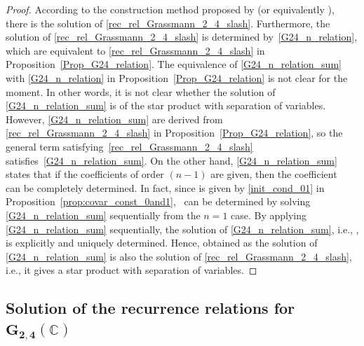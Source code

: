 \documentclass[10pt,a4paper]{amsart}
\numberwithin{equation}{section}
\begin{document}
\begin{proof}
According to the construction method proposed by \cite{HS1,HS2} (or equivalently \cite{SSU1,SSU2}), there is the solution
of \eqref{rec_rel_Grassmann_2_4_slash}.
Furthermore, the solution  of \eqref{rec_rel_Grassmann_2_4_slash} is determined by~\eqref{G24_n_relation}, which are equivalent to \eqref{rec_rel_Grassmann_2_4_slash} in Proposition~\ref{Prop_G24_relation}.
The equivalence of \eqref{G24_n_relation_sum} with \eqref{G24_n_relation} in Proposition~\ref{Prop_G24_relation} is not clear for the moment. In other words, it is not clear whether the solution of \eqref{G24_n_relation_sum} is  of the star product with separation of variables.
However, \eqref{G24_n_relation_sum} are derived from \eqref{rec_rel_Grassmann_2_4_slash} in Proposition~\ref{Prop_G24_relation}, so the general term  satisfying~\eqref{rec_rel_Grassmann_2_4_slash} satisfies~\eqref{G24_n_relation_sum}.
On the other hand, \eqref{G24_n_relation_sum} states that if the
coefficients of order $(n-1)$ are given, then the coefficient~ can be completely determined.
In fact, since  is given by \eqref{init_cond_01} in Proposi\-tion~\ref{prop:covar_const_0and1}, ~can be determined by solving \eqref{G24_n_relation_sum} sequentially from the $n=1$ case.
By applying \eqref{G24_n_relation_sum} sequentially, the solution of \eqref{G24_n_relation_sum}, i.e., , is explicitly and uniquely determined.
Hence,  obtained as the solution of \eqref{G24_n_relation_sum} is also the solution of \eqref{rec_rel_Grassmann_2_4_slash}, i.e., it gives a star product with separation of variables.
\end{proof}

\subsection[Solution of the recurrence relations for G\_\{2,4\}(C)]{Solution of the recurrence relations for $\boldsymbol{G_{2,4}(\mathbb{C})}$}
\label{G24_recrel_solve}
\end{document}
